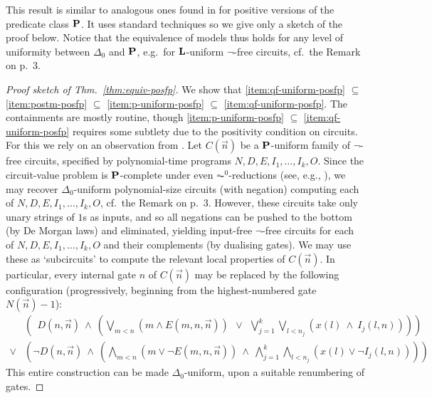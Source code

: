 \documentclass{lmcs}
\begin{document}

\noindent

This result is similar to analogous ones found in \cite{LautemannSS96:on-pos-p} for positive versions of the predicate class $\mathbf{P}$. It uses standard techniques so we give only a sketch of the proof below.
Notice that the equivalence of models thus holds for any level of uniformity between $\Delta_0$ and $\mathbf{P}$, e.g.\ for $\mathbf{L}$-uniform $\neg$-free circuits, cf.~the Remark on p.~3.

\begin{proof}
	[Proof sketch of Thm.~\ref{thm:equiv-posfp}]
	We show that \eqref{item:qf-uniform-posfp} $\subseteq$ \eqref{item:postm-posfp} $\subseteq $ \eqref{item:p-uniform-posfp} $\subseteq $ \eqref{item:qf-uniform-posfp}.
	The containments are mostly routine, though \eqref{item:p-uniform-posfp} $\subseteq$ \eqref{item:qf-uniform-posfp} requires some subtlety due to the positivity condition on circuits. For this we rely on an observation from \cite{grigni1991structure}. Let $C(\vec n)$ be a $\mathbf{P}$-uniform family of $\neg$-free circuits, specified by polynomial-time programs $N,D,E,I_1, \dots , I_k, O$.
 Since the circuit-value problem is $\mathbf{P}$-complete under even $\AC^0$-reductions (see, e.g., \cite{Cook:2010:LFP:1734064}), we may recover $\Delta_0$-uniform polynomial-size circuits (with negation) computing each of $N,D,E,I_1, \dots , I_k, O$, cf.~the Remark on p.~3.
	However, these circuits take only unary strings of $1$s as inputs, and so all negations can be pushed to the bottom (by De Morgan laws) and eliminated, yielding input-free $\neg$-free circuits for each of $N,D,E,I_1, \dots , I_k, O$ and their complements (by dualising gates). We may use these as `subcircuits' to compute the relevant local properties of $C(\vec n)$. In particular, every internal gate $n$ of $C(\vec n)$ may be replaced by the following configuration (progressively, beginning from the highest-numbered gate $N(\vec n)-1$):
	\[
	\begin{array}{rl}
	& 
	\left(
	\ \ D(n,\vec n)\ \wedge\ \left(\bigvee\limits_{m<n} \left(m \wedge E(m,n,\vec n) \right) \ \ \vee \ \ \bigvee\limits_{j=1}^k \bigvee\limits_{l<n_j} \left( x(l) \ \wedge \ I_j (l,n) \right) \right)
	 \right) 
	 \\
		\vee &  \left(
		\neg D(n,\vec n)\ \wedge\ 
		\left(\bigwedge\limits_{m<n} \left( m \vee \neg E(m,n,\vec n) \right)
		\ \wedge \ 
		\bigwedge\limits_{j=1}^k \bigwedge\limits_{l<n_j} \left( x(l) \vee \neg I_j (l,n) \right)\right)
		\right)
	\end{array}
	\]
	This entire construction can be made $\Delta_0$-uniform, upon a suitable renumbering of gates.
	

\end{proof}
\end{document}
